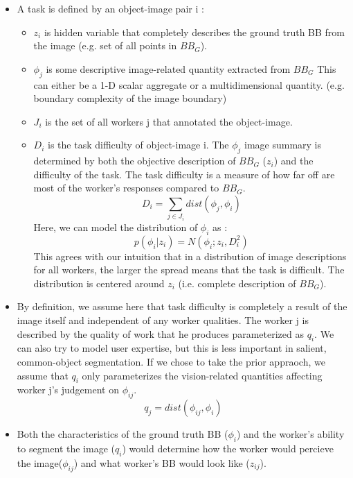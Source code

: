 \documentclass[12pt]{article}
\begin{document}
\begin{itemize}
\item A task is defined by an object-image pair i : 
\begin{itemize}
\item $z_i$ is hidden variable that completely describes the ground truth BB from the image (e.g. set of all points in $BB_G$).
\item  $\phi_j$ is some descriptive image-related quantity extracted from $BB_G$ This can either be a 1-D scalar aggregate or a multidimensional quantity. (e.g. boundary complexity of the image boundary)
\item $J_i$ is the set of all workers j that annotated the object-image. 
\item $D_i$ is the task difficulty of object-image i.  The $\phi_j$ image summary is determined by both the objective description of $BB_G$ ($z_i$) and the difficulty of the task. The task difficulty is a measure of how far off are most of the worker's responses compared to $BB_G$.  
\begin{equation}
D_i = \sum_{j\in J_i} dist(\phi_j,\phi_i)
\end{equation}
Here, we can model the distribution of $\phi_i$ as :
$$p(\phi_i|z_i) = N(\phi_i;z_i,D_i^2)$$
This agrees with our intuition that in a distribution of image descriptions for all workers, the larger the spread means that the task is difficult. The distribution is centered around $z_i$ (i.e. complete description of $BB_G$).
\end{itemize}
\item By definition, we assume here that task difficulty is completely a result of the image itself and independent of any worker qualities. The worker j is described by the quality of work that he produces parameterized as $q_i$. We can also try to model user expertise, but this is less important in salient, common-object segmentation. If we chose to take the prior appraoch, we assume that $q_i$ only parameterizes the vision-related quantities affecting worker j's judgement on $\phi_{ij}$.
\begin{equation}
q_j = dist(\phi_{ij},\phi_i)
\end{equation}
\item Both the characteristics of the ground truth BB ($\phi_i$) and the worker's ability to segment the image ($q_i$) would determine how the worker would percieve the image($\phi_{ij}$) and what worker's BB would look like ($z_{ij}$).
\end{itemize}
\end{document}
